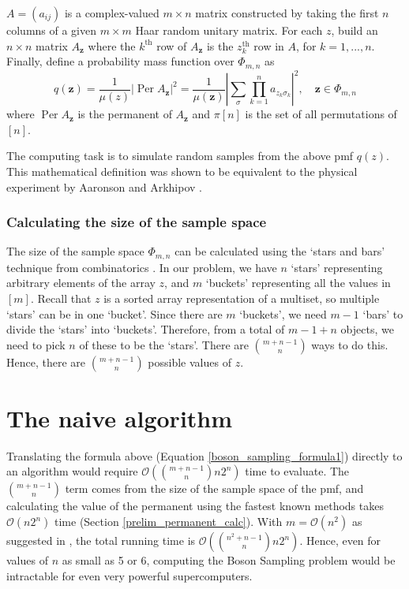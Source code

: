 \documentclass[ %
                    author={Manan Vaswani},
                supervisor={Dr. Raphael Clifford},
                    degree={MEng},
                     title={A multi-core CPU implementation of the classical Boson Sampling algorithm},
                  subtitle={},
                      type={},
                      year={2019} ]{dissertation}
\theoremstyle{plain}
\theoremstyle{definition}
\DeclareMathOperator*{\Per}{\mathrm{Per}}
\begin{document}
$A = (a_{ij})$ is a complex-valued $m \times n$ matrix constructed by taking the first $n$ columns of a given $m \times m$ Haar random unitary matrix. For each $z$, build an $n \times n$ matrix $A_\mathbf{z}$ where the $k^{\text{th}}$ row of $A_\mathbf{z}$ is the $z_k^{\text{th}}$ row in $A$, for $k = 1, ... , n$. Finally, define a probability mass function over $\Phi_{m,n}$  as
\begin{equation}\label{boson_sampling_formula1}
q (\mathbf{z}) = \frac{1}{\mu(z)} \left|\Per A_\mathbf{z} \right| ^2 = \frac{1}{\mu(\mathbf{z})}  \left|\sum_{\sigma} \prod_{k=1}^n a_{z_k \sigma_k}\right|^2, \quad \mathbf{z} \in \Phi_{m,n}
\end{equation}
where $\Per A_\mathbf{z}$ is the permanent of $A_\mathbf{z}$ and $\pi[n]$ is the set of all permutations of $[n]$.

The computing task is to simulate random samples from the above pmf $q(z)$. This mathematical definition was shown to be equivalent to the physical experiment by Aaronson and Arkhipov \cite{aaronson2011}.
\subsubsection{Calculating the size of the sample space}
The size of the sample space $ \Phi_{m,n}$ can be calculated using the `stars and bars' technique from combinatorics \cite{feller1968}. In our problem, we have $n$ `stars' representing arbitrary elements of the array $z$, and $m$ `buckets' representing all the values in $[m]$. Recall that $z$ is a sorted array representation of a multiset, so multiple `stars' can be in one `bucket'. Since there are $m$ `buckets', we need $m-1$ `bars' to divide the `stars' into `buckets'. Therefore, from a total of $m-1 + n$ objects, we need to pick $n$ of these to be the `stars'. There are $\binom{m+n-1}{n}$ ways to do this. Hence, there are $\binom{m+n-1}{n}$ possible values of $z$.

\section{The naive algorithm}
Translating the formula above (Equation \ref{boson_sampling_formula1}) directly to an algorithm would require $\mathcal{O}(\binom{m+n-1}{n} n 2^n)$ time to evaluate. The $\binom{m+n-1}{n}$ term comes from the size of the sample space of the pmf, and calculating the value of the permanent using the fastest known methods takes $\mathcal{O}(n 2^n)$ time (Section \ref{prelim_permanent_calc}). With $m = \mathcal{O}(n^2)$ as suggested in \cite{aaronson2011}, the total running time is $\mathcal{O}(\binom{n^2+n-1}{n} n 2^n)$. Hence, even for values of $n$ as small as 5 or 6, computing the Boson Sampling problem would be intractable for even very powerful supercomputers.
\end{document}
